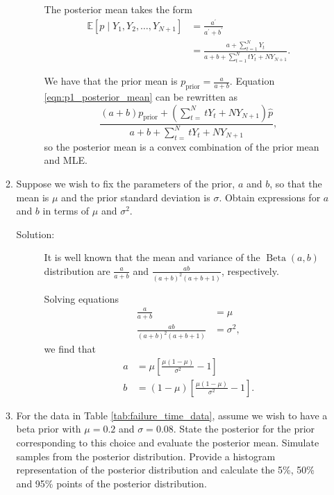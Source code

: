 \documentclass[letterpaper,11pt]{article}
\begin{document}
\begin{enumerate}
\begin{enumerate}
\begin{description}
      The posterior mean takes the form
      \begin{align}
        \mathbb{E}\left[
        p \mid Y_1,Y_2,\ldots,Y_{N+1}
        \right]
        &= \frac{a^\prime}{a^\prime + b^\prime}
          \nonumber \\
        &= \frac{a + \sum_{t=1}^N Y_t}
          {a + b + \sum_{t=1}^N tY_t + NY_{N+1}}. \label{eqn:p1_posterior_mean}
      \end{align}

      We have that the prior mean is $p_{\mathrm{prior}} = \frac{a}{a + b}$.
      Equation \ref{eqn:p1_posterior_mean} can be rewritten as
      \begin{equation}
        \boxed{
        \frac{
          \left(a + b\right)
          p_{\mathrm{prior}}
          +
          \left(
            \sum_{t=}^N tY_t + NY_{N+1}
          \right)
          \hat{p}}
          {a + b + \sum_{t=}^N tY_t + NY_{N+1}},}
        \label{eqn:p1_posterior_mean_sum}
      \end{equation}
      so the posterior mean is a convex combination of the prior mean and MLE.
    \end{description}
  \item Suppose we wish to fix the parameters of the prior, $a$ and $b$, so that
    the mean is $\mu$ and the prior standard deviation is $\sigma$. Obtain
    expressions for $a$ and $b$ in terms of $\mu$ and $\sigma^2$.
    \begin{description}
    \item[Solution:] It is well known that the mean and variance of the
      $\operatorname{Beta}\left(a,b\right)$ distribution are $\frac{a}{a+b}$ and
      $\frac{ab}{(a+b)^2(a+b+1)}$, respectively.

      Solving equations
      \begin{align*}
        \frac{a}{a + b}
        &= \mu \\
        \frac{ab}{(a+b)^2(a+b+1)} &= \sigma^2,
      \end{align*}
      we find that
      \begin{align}
        a
        &= \mu\left[
          \frac{\mu\left(1 - \mu\right)}{\sigma^2} - 1
          \right]
          \label{eqn:p1_a} \\
        b
        &=  \left(1 - \mu\right)\left[
          \frac{\mu\left(1 - \mu\right)}{\sigma^2} - 1
          \right].
          \label{eqn:p1_b}
      \end{align}
    \end{description}
  \item For the data in Table \ref{tab:failure_time_data}, assume we wish to
    have a beta prior with $\mu = 0.2$ and $\sigma = 0.08$. State the posterior
    for the prior corresponding to this choice and evaluate the posterior
    mean. Simulate samples from the posterior distribution. Provide a histogram
    representation of the posterior distribution and calculate the 5\%, 50\% and
    95\% points of the posterior distribution.


\end{enumerate}
\end{enumerate}
\end{document}
